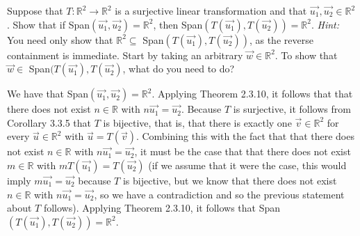 \documentclass[12pt]{article}
\newenvironment{problem}[2][Problem]
{
	\begin{trivlist} 
		\item[\hskip \labelsep {\bfseries #1 #2:}]
	}
{
	\end{trivlist}
	}
\newenvironment{solution}[1][Solution]
{
	\begin{trivlist} 
		\item[\hskip \labelsep {\itshape #1:}]
	}
	{
	\end{trivlist}
}
\begin{document}

\begin{problem}{1}
Suppose that $T:\mathbb{R}^2 \to \mathbb{R}^2$ is a surjective linear transformation and that $\vec{u_{1}},\vec{u_{2}} \in \mathbb{R}^2$. Show that if Span$(\vec{u_{1}},\vec{u_{2}}) = \mathbb{R}^2$, then Span$(T(\vec{u_{1}}),T(\vec{u_{2}}))=\mathbb{R}^2$.
\noindent
\newline
\newline
{\it Hint:} You need only show that $\mathbb{R}^2 \subseteq$ Span$(T(\vec{u_{1}}),T(\vec{u_{2}}))$, as the reverse containment is immediate. Start by taking an arbitrary $\vec{w} \in \mathbb{R}^2$. To show that $\vec{w} \in$ Span$(T(\vec{u_{1}}),T(\vec{u_{2}})$, what do you need to do?
\noindent
\newline
\newline

\begin{solution}
We have that Span$(\vec{u_{1}},\vec{u_{2}}) =\mathbb{R}^2$. Applying Theorem 2.3.10, it follows that that there does not exist $n \in \mathbb{R}$ with $n\vec{u_{1}}=\vec{u_{2}}$. %
Because $T$ is surjective, it follows from Corollary 3.3.5 that $T$ is bijective, that is, that there is exactly one $\vec{v} \in \mathbb{R}^2$ for every $\vec{u} \in \mathbb{R}^2$ with $\vec{u}=T(\vec{v})$. Combining this with the fact that that there does not exist $n \in \mathbb{R}$ with $n\vec{u_{1}}=\vec{u_{2}}$, it must be the case that that there does not exist $m \in \mathbb{R}$ with $mT(\vec{u_{1}})=T(\vec{u_{2}})$ (if we assume that it were the case, this would imply $m\vec{u_{1}}=\vec{u_{2}}$ because $T$ is bijective, but we know that there does not exist $n \in \mathbb{R}$ with $n\vec{u_{1}}=\vec{u_{2}}$, so we have a contradiction and so the previous statement about $T$ follows). Applying Theorem 2.3.10, it follows that Span$(T(\vec{u_{1}}),T(\vec{u_{2}})) = \mathbb{R}^2$. 


\end{solution}
\end{problem}
\end{document}
